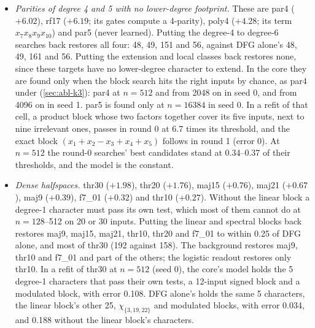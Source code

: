 \begin{itemize}
\item \emph{Parities of degree 4 and 5 with no lower-degree footprint.} These are par4 ($+6.02$), rf17 ($+6.19$; its gates compute a 4-parity), poly4 ($+4.28$; its term $x_7x_8x_9x_{10}$) and par5 (never learned). Putting the degree-4 to degree-6 searches back restores all four: 48, 49, 151 and 56, against DFG alone's 48, 49, 161 and 56. Putting the extension and local classes back restores none, since these targets have no lower-degree character to extend. In the core they are found only when the block search hits the right inputs by chance, as par4 under  (\cref{sec:abl-k3}): par4 at $n=512$ and from 2048 on in seed 0, and from 4096 on in seed 1. par5 is found only at $n=16384$ in seed 0. In a refit of that cell, a product block whose two factors together cover its five inputs, next to nine irrelevant ones, passes in round 0 at 6.7 times its threshold, and the exact block $(x_1+x_2-x_3+x_4+x_5)$ follows in round 1 (error 0). At $n=512$ the round-0 searches' best candidates stand at 0.34--0.37 of their thresholds, and the model is the constant.
\item \emph{Dense halfspaces.} thr30 ($+1.98$), thr20 ($+1.76$), maj15 ($+0.76$), maj21 ($+0.67$), maj9 ($+0.39$), f7\_01 ($+0.32$) and thr10 ($+0.27$). Without the linear block a degree-1 character must pass its own test, which most of them cannot do at $n=128$--512 on 20 or 30 inputs. Putting the linear and spectral blocks back restores maj9, maj15, maj21, thr10, thr20 and f7\_01 to within 0.25 of DFG alone, and most of thr30 (192 against 158). The background restores maj9, thr10 and f7\_01 and part of the others; the logistic readout restores only thr10. In a refit of thr30 at $n=512$ (seed 0), the core's model holds the 5 degree-1 characters that pass their own tests, a 12-input signed block and a modulated block, with error 0.108. DFG alone's holds the same 5 characters, the linear block's other 25, $\chi_{\{3,19,22\}}$ and modulated blocks, with error 0.034, and 0.188 without the linear block's characters.

\end{itemize}
